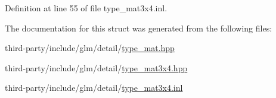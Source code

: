 Definition at line 55 of file type\+\_\+mat3x4.\+inl.



The documentation for this struct was generated from the following files\+:\begin{DoxyCompactItemize}
\item 
third-\/party/include/glm/detail/\hyperlink{type__mat_8hpp}{type\+\_\+mat.\+hpp}\item 
third-\/party/include/glm/detail/\hyperlink{type__mat3x4_8hpp}{type\+\_\+mat3x4.\+hpp}\item 
third-\/party/include/glm/detail/\hyperlink{type__mat3x4_8inl}{type\+\_\+mat3x4.\+inl}\end{DoxyCompactItemize}
